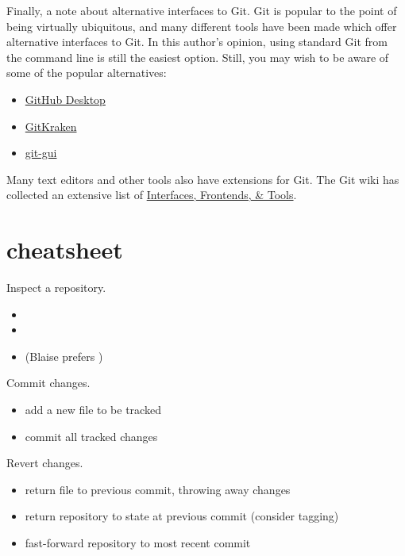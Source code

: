 \documentclass{training}
\begin{document}
Finally, a note about alternative interfaces to Git.
Git is popular to the point of being virtually ubiquitous, and many different tools have been made which offer alternative interfaces to Git.
In this author's opinion, using standard Git from the command line is still the easiest option.
Still, you may wish to be aware of some of the popular alternatives:
\begin{itemize}
  \item \href{https://desktop.github.com/}{GitHub Desktop}
  \item \href{https://www.gitkraken.com/}{GitKraken}
  \item \href{https://git-scm.com/docs/git-gui}{git-gui}
\end{itemize}
Many text editors and other tools also have extensions for Git.
The Git wiki has collected an extensive list of \href{https://git.wiki.kernel.org/index.php/InterfacesFrontendsAndTools}{Interfaces, Frontends, \& Tools}.

\clearpage
\section{cheatsheet}

Inspect a repository.
\begin{itemize}
  \item {}
  \item {}
  \item {} (Blaise prefers )
\end{itemize}

Commit changes.
\begin{itemize}
  \item {} add a new file to be tracked
  \item {} commit all tracked changes
\end{itemize}

Revert changes.
\begin{itemize}
  \item {} return file to previous commit, throwing away changes
  \item {} return repository to state at previous commit (consider tagging)
  \item {} fast-forward repository to most recent commit
\end{itemize}
\end{document}
